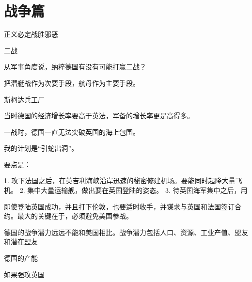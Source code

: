 \chapter{战争篇}

正义必定战胜邪恶

二战

从军事角度说，纳粹德国有没有可能打赢二战？

把潜艇战作为次要手段，航母作为主要手段。

斯柯达兵工厂

当时德国的经济增长率要高于英法，军备的增长率更是高得多。

一战时，德国一直无法突破英国的海上包围。

我的计划是“引蛇出洞”。

要点是：

1. 攻下法国之后，在英吉利海峡沿岸迅速的秘密修建机场。要能同时起降大量飞机。
2. 集中大量运输舰，做出要在英国登陆的姿态。
3. 待英国海军集中之后，用

即使登陆英国成功，并且打下伦敦，也要适时收手，并谋求与英国和法国签订合约。最大的关键在于，必须避免美国参战。

德国的战争潜力远远不能和美国相比。战争潜力包括人口、资源、工业产值、盟友和潜在盟友

德国的产能



如果强攻英国